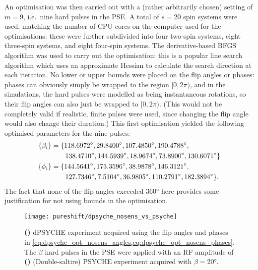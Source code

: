 An optimisation was then carried out with a (rather arbitrarily chosen) setting of $m = 9$, i.e.\ nine hard pulses in the PSE.
A total of $s = 20$ spin systems were used, matching the number of CPU cores on the computer used for the optimisations: these were further subdivided into four two-spin systems, eight three-spin systems, and eight four-spin systems.
The derivative-based BFGS algorithm was used to carry out the optimisation: this is a popular line search algorithm which uses an approximate Hessian to calculate the search direction at each iteration.\autocite{Kelley1999,Nocedal2006}
No lower or upper bounds were placed on the flip angles or phases: phases can obviously simply be wrapped to the region $[0, 2\pi)$, and in the simulations, the hard pulses were modelled as being instantaneous rotations, so their flip angles can also just be wrapped to $[0, 2\pi)$.
(This would not be completely valid if realistic, finite pulses were used, since changing the flip angle would also change their duration.)
This first optimisation yielded the following optimised parameters for the nine pulses:
\begin{align}
    \{\beta_i\} &= \{\ang{118.6972}, \ang{29.8400}, \ang{107.4850}, \ang{190.4788}, \notag \\
                &\qquad \ang{138.4710}, \ang{144.5939}, \ang{18.9674}, \ang{73.8900}, \ang{130.6071}\} \label{eq:dpsyche_opt_nosens_angles} \\
     \{\phi_i\} &= \{\ang{144.5641}, \ang{173.3596}, \ang{38.9878}, \ang{146.3121}, \notag \\
                &\qquad \ang{127.7346}, \ang{7.5104}, \ang{36.9805}, \ang{110.2791}, \ang{182.3894}\}. \label{eq:dpsyche_opt_nosens_phases}
\end{align}
The fact that none of the flip angles exceeded \ang{360} here provides some justification for not using bounds in the optimisation.

\begin{figure}[htb]
    \centering
    \texttt{[image: pureshift/dpsyche\_nosens\_vs\_psyche]}%
    {\label{fig:dpsyche_nosens_vs_psyche_dp}}%
    {\label{fig:dpsyche_nosens_vs_psyche_p}}%
    \caption[Comparison of optimised dPSYCHE and PSYCHE]{
        \textbf{()} dPSYCHE experiment acquired using the flip angles and phases in \cref{eq:dpsyche_opt_nosens_angles,eq:dpsyche_opt_nosens_phases}.
        The $\beta$ hard pulses in the PSE were applied with an RF amplitude of 
        \textbf{()} (Double-saltire) PSYCHE experiment acquired with $\beta = \ang{20}$.
    }
    \label{fig:dpsyche_nosens_vs_psyche}
\end{figure}

